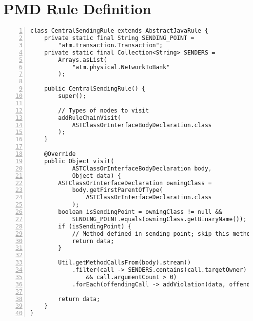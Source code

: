 \chapter{PMD Rule Definition}
\label{apx:pmd}

\begin{lstlisting}[caption={PMD custom rule that enforces constraint 3.}, captionpos=b, label=lst:pmd_rule, numbers=left, showstringspaces=false]
class CentralSendingRule extends AbstractJavaRule {
    private static final String SENDING_POINT =
        "atm.transaction.Transaction";
    private static final Collection<String> SENDERS =
        Arrays.asList(
            "atm.physical.NetworkToBank"
        );

    public CentralSendingRule() {
        super();

        // Types of nodes to visit
        addRuleChainVisit(
            ASTClassOrInterfaceBodyDeclaration.class
        );
    }

    @Override
    public Object visit(
            ASTClassOrInterfaceBodyDeclaration body,
            Object data) {
        ASTClassOrInterfaceDeclaration owningClass =
            body.getFirstParentOfType(
                ASTClassOrInterfaceDeclaration.class
            );
        boolean isSendingPoint = owningClass != null &&
            SENDING_POINT.equals(owningClass.getBinaryName());
        if (isSendingPoint) {
            // Method defined in sending point; skip this method
            return data;
        }

        Util.getMethodCallsFrom(body).stream()
            .filter(call -> SENDERS.contains(call.targetOwner)
                && call.argumentCount > 0)
            .forEach(offendingCall -> addViolation(data, offendingCall.source));

        return data;
    }
}
\end{lstlisting}